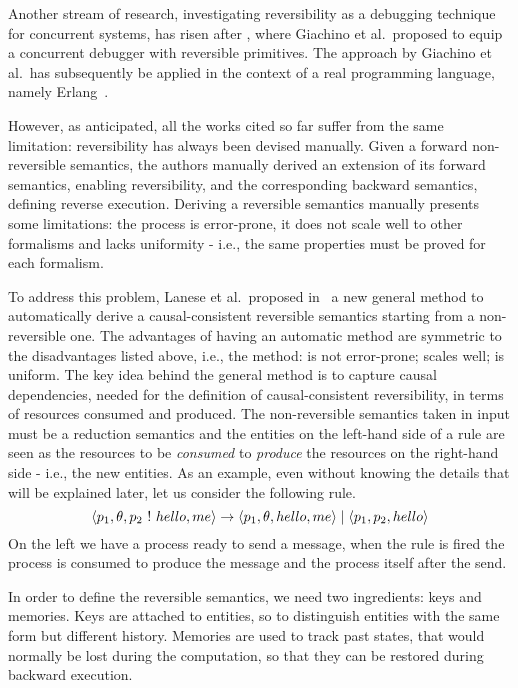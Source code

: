 \documentclass{article}[12pt,a4paper]
\theoremstyle{definition}
\newcommand{\paral}{\;|\;}
\begin{document}
Another stream of research, investigating reversibility as a debugging technique for concurrent systems,
has risen after \cite{GiachinoLM14}, where Giachino et al.~proposed to
equip a concurrent debugger with reversible primitives.
The approach by Giachino et al.~has subsequently be applied in the context of a real programming language, namely Erlang~\cite{LaneseNPV18,Lanese0PV18,Gonzalez-AbrilV21,FabbrettiLS21}.

However, as anticipated, all the works cited so far suffer from the same limitation: reversibility has always been
devised manually. Given a forward non-reversible semantics, the authors manually
derived an extension of its forward semantics, enabling reversibility, and the corresponding backward semantics, defining reverse execution.
Deriving a reversible semantics manually presents some limitations: the
process is error-prone, it does not scale well to other formalisms and lacks
uniformity - i.e., the same properties must be proved for each formalism.

To address this problem, Lanese et al.~proposed in~\cite{LaneseM20} a
new general method to
automatically derive a causal-consistent reversible semantics starting from a non-reversible one. The
advantages of having an automatic method are symmetric to the disadvantages
listed above, i.e., the method: is not error-prone; scales well; is uniform. The key idea behind the general method is to capture
causal dependencies, needed for the definition of causal-consistent reversibility, in terms of resources consumed and produced. The non-reversible
semantics taken in input must be a reduction semantics and the entities on the
left-hand side of a rule are seen as the resources to be \emph{consumed} to
\emph{produce} the resources on the right-hand side - i.e., the new entities.
As an example, even without knowing the details that will be explained later, let
us consider the following rule. 
\[\langle p_1, \theta, p_2~\ms{!}~hello, me\rangle \rightarrow \langle p_1, \theta,
  hello, me\rangle \paral\langle p_1, p_2,hello \rangle\]
On the left we have a process ready to send a
message, when the rule is fired the process is consumed to produce the message
and the process itself after the send.

In order to define the reversible semantics, we need two ingredients: keys and memories.
Keys are attached to entities, so to distinguish entities with the same form but different history.
Memories are used to track past states, that would normally be lost during the computation, so that
they can be restored during backward execution.
\end{document}
